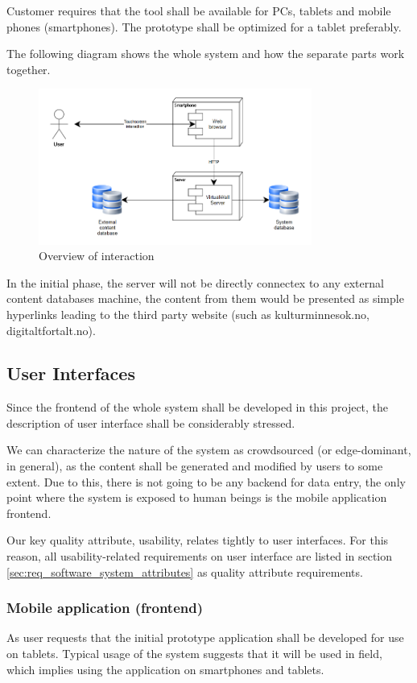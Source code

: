 \documentclass[11pt]{book}
\begin{document}
Customer requires that the tool shall be available for PCs, tablets and mobile phones (smartphones). The prototype shall be optimized for a tablet preferably.

The following diagram shows the whole system and how the separate parts work together.

\begin{figure}[H]
      \centering
      \includegraphics[width=0.8\textwidth]{Figures/Requirements/overview.png}
      \caption{Overview of interaction}
      \label{fig:req_overview}
\end{figure}

In the initial phase, the server will not be directly connectex to any external content databases machine, the content from them would be presented as simple hyperlinks leading to the third party website (such as kulturminnesok.no, digitaltfortalt.no).

\subsection{User Interfaces}
Since the frontend of the whole system shall be developed in this project, the description of user interface shall be considerably stressed.

We can characterize the nature of the system as crowdsourced (or edge-dominant, in general), as the content shall be generated and modified by users to some extent. Due to this, there is not going to be any backend for data entry, the only point where the system is exposed to human beings is the mobile application frontend.

Our key quality attribute, usability, relates tightly to user interfaces. For this reason, all usability-related requirements on user interface are listed in section \ref{sec:req_software_system_attributes} as quality attribute requirements.

\subsubsection{Mobile application (frontend)}\label{sec:req_webapplication_frontend}
As user requests that the initial prototype application shall be developed for use on tablets. Typical usage of the system suggests that it will be used in field, which implies using the application on smartphones and tablets.
\end{document}
